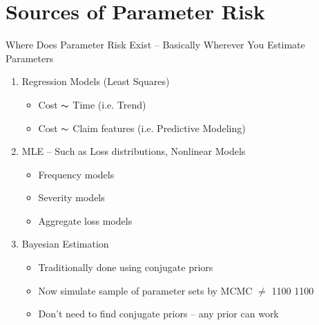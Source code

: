 \documentclass[10pt, xcolor=x11names,compress]{beamer}
\begin{document}
\section{Sources of Parameter Risk}
\begin{frame}{Where Does Parameter Risk Exist --  Basically Wherever You Estimate Parameters}
	\begin{enumerate}
		\item<1-> Regression Models (Least Squares)
			\begin{itemize}
				\item<1-> Cost $\thicksim$ Time (i.e. Trend)
				\item<1-> Cost $\thicksim$ Claim features (i.e. Predictive Modeling)
			\end{itemize}
		\item<2-> MLE -- Such as Loss distributions, Nonlinear Models
			\begin{itemize}
				\item<2-> Frequency models
				\item<2-> Severity models
				\item<2-> Aggregate loss models
			\end{itemize}
		\item<3-> Bayesian Estimation
		\begin{itemize}
			\item<2-> Traditionally done using conjugate priors
			\item<2-> Now simulate sample of parameter sets by MCMC $\ne$ 1100 1100
			\item<2-> Don't need to find conjugate priors -- any prior can work
		\end{itemize}		
	\end{enumerate}
\end{frame}

\end{document}
